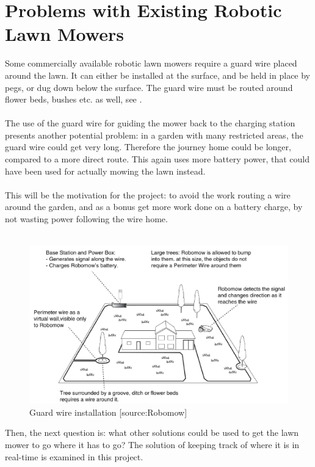 \section{Problems with Existing Robotic Lawn Mowers}
Some commercially available robotic lawn mowers require a guard wire placed around the lawn. It can either be installed at the surface, and be held in place by pegs, or dug down below the surface. The guard wire must be routed around flower beds, bushes etc. as well, see .\\\\
%
The use of the guard wire for guiding the mower back to the charging station presents another potential problem: in a garden with many restricted areas, the guard wire could get very long. Therefore the journey home could be longer, compared to a more direct route. This again uses more battery power, that could have been used for actually mowing the lawn instead.\\\\
%
This will be the motivation for the project: to avoid the work routing a wire around the garden, and as a bonus get more work done on a battery charge, by not wasting power following the wire home.\\\\

\begin{figure}[H]
\centering
\includegraphics[scale=0.6]{figures/robomow.png} 
\caption{Guard wire installation [source:Robomow]}
\label{fig:robomow} 
\end{figure}
\noindent

Then, the next question is: what other solutions could be used to get the lawn mower to go where it has to go?
The solution of keeping track of where it is in real-time is examined in this project.